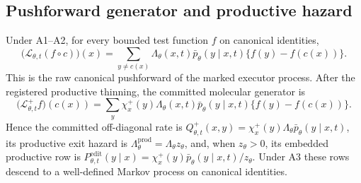 \subsection{Pushforward generator and productive hazard}
\label{sec:app-compose-pushforward-proof}

\begin{composeappendixproposition}
\label{prop:app-compose-pushforward}
Under A1--A2, for every bounded test function
$f$ on canonical identities,
\begin{equation}
  \bigl(\mathcal L_{\theta,t}(f\circ c)\bigr)(x)
  =
  \sum_{y\neq c(x)}
  \Lambda_\theta(x,t)\bar p_\theta(y\mid x,t)
  \{f(y)-f(c(x))\}.
  \label{eq:app-compose-pushed-generator}
\end{equation}
This is the raw canonical pushforward of the marked executor process. After
the registered productive thinning, the committed molecular generator is
\begin{equation}
  \bigl(\mathcal L_{\theta,t}^{+}f\bigr)(c(x))
  =
  \sum_y
  \chi_x^+(y)\Lambda_\theta(x,t)\bar p_\theta(y\mid x,t)
  \{f(y)-f(c(x))\}.
  \label{eq:app-compose-committed-generator}
\end{equation}
Hence the committed off-diagonal rate is
$Q_{\theta,t}^{+}(x,y)=
\chi_x^+(y)\Lambda_\theta\bar p_\theta(y\mid x,t)$,
its productive exit hazard is
$\Lambda_\theta^{\mathrm{prod}}=\Lambda_\theta z_\theta$,
and, when $z_\theta>0$, its embedded productive row is
$P_{\theta,t}^{\mathrm{edit}}(y\mid x)=
\chi_x^+(y)\bar p_\theta(y\mid x,t)/z_\theta$. Under A3 these rows descend to a
well-defined Markov process on canonical identities.
\end{composeappendixproposition}

